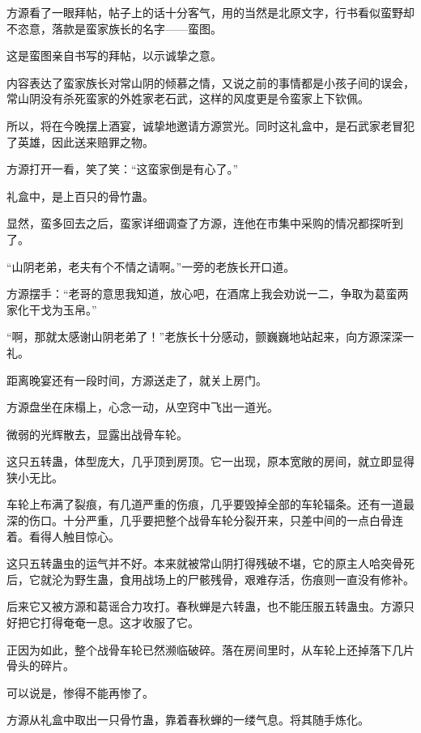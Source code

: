 
\begin{this_body}

方源看了一眼拜帖，帖子上的话十分客气，用的当然是北原文字，行书看似蛮野却不恣意，落款是蛮家族长的名字——蛮图。

这是蛮图亲自书写的拜帖，以示诚挚之意。

内容表达了蛮家族长对常山阴的倾慕之情，又说之前的事情都是小孩子间的误会，常山阴没有杀死蛮家的外姓家老石武，这样的风度更是令蛮家上下钦佩。

所以，将在今晚摆上酒宴，诚挚地邀请方源赏光。同时这礼盒中，是石武家老冒犯了英雄，因此送来赔罪之物。

方源打开一看，笑了笑：“这蛮家倒是有心了。”

礼盒中，是上百只的骨竹蛊。

显然，蛮多回去之后，蛮家详细调查了方源，连他在市集中采购的情况都探听到了。

“山阴老弟，老夫有个不情之请啊。”一旁的老族长开口道。

方源摆手：“老哥的意思我知道，放心吧，在酒席上我会劝说一二，争取为葛蛮两家化干戈为玉帛。”

“啊，那就太感谢山阴老弟了！”老族长十分感动，颤巍巍地站起来，向方源深深一礼。

距离晚宴还有一段时间，方源送走了，就关上房门。

方源盘坐在床榻上，心念一动，从空窍中飞出一道光。

微弱的光辉散去，显露出战骨车轮。

这只五转蛊，体型庞大，几乎顶到房顶。它一出现，原本宽敞的房间，就立即显得狭小无比。

车轮上布满了裂痕，有几道严重的伤痕，几乎要毁掉全部的车轮辐条。还有一道最深的伤口。十分严重，几乎要把整个战骨车轮分裂开来，只差中间的一点白骨连着。看得人触目惊心。

这只五转蛊虫的运气并不好。本来就被常山阴打得残破不堪，它的原主人哈突骨死后，它就沦为野生蛊，食用战场上的尸骸残骨，艰难存活，伤痕则一直没有修补。

后来它又被方源和葛谣合力攻打。春秋蝉是六转蛊，也不能压服五转蛊虫。方源只好把它打得奄奄一息。这才收服了它。

正因为如此，整个战骨车轮已然濒临破碎。落在房间里时，从车轮上还掉落下几片骨头的碎片。

可以说是，惨得不能再惨了。

方源从礼盒中取出一只骨竹蛊，靠着春秋蝉的一缕气息。将其随手炼化。


\end{this_body}
